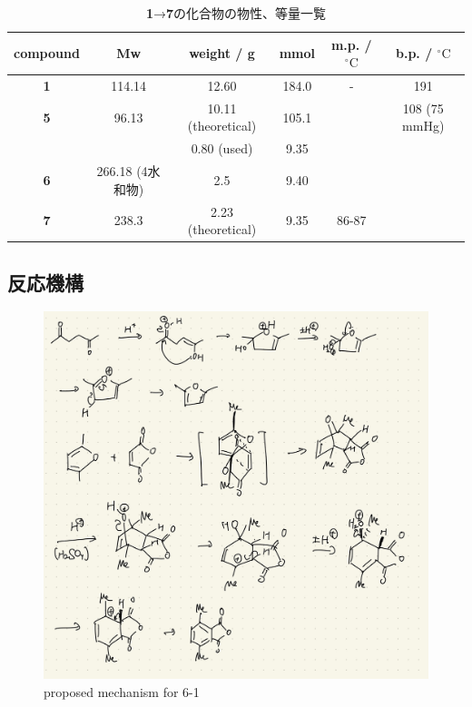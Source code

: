 \documentclass{ltjsarticle}
\theoremstyle{definition}
\numberwithin{equation}{section}
\newcommand{\D}{^\circ\text{C}}
\begin{document}
\begin{table}[htp]
\caption{\textbf{1}→\textbf{7}の化合物の物性、等量一覧}
\begin{center}
\begin{tabular}{cccccc}
\toprule
compound & Mw & weight / g & mmol & m.p. / $\D$ & b.p. / $\D$\\
\midrule
\textbf{1} & 114.14 & 12.60 & 184.0 & - & 191\\
\textbf{5} & 96.13 & 10.11 (theoretical) & 105.1 & & 108 (75 mmHg) \\%
  &  & 0.80 (used) & 9.35 & \\
\textbf{6} & 266.18 (4水和物) & 2.5 & 9.40 & & \\
\textbf{7} & 238.3 & 2.23 (theoretical) & 9.35 & 86-87 & \\
\bottomrule
\end{tabular}
\end{center}
\label{properties_6-2}
\end{table}%
 
\newpage
\subsection{反応機構}
\begin{figure}[htbp]
\begin{center}
\includegraphics[width = 15 cm]{mechanism_6-1.jpg}
\caption{proposed mechanism for 6-1}
\label{mechanism_6-1}
\end{center}
\end{figure}
\end{document}
